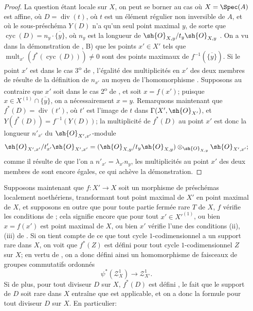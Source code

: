 \begin{proof}
La question étant locale sur $X$, on peut se borner au cas où $X=\Spec(A)$ est affine, où $D=\operatorname{div}(t)$, où $t$ est un élément régulier non inversible de $A$, et où le sous-préschéma $Y(D)$  n'a qu'un seul point maximal $y$, de sorte que $\operatorname{cyc}(D)=n_y\cdot\overline{\{y\}}$, où $n_y$ est la longueur de $\sh{O}_{X,y}/t_y\sh{O}_{X,y}$ .
On a vu dans la démonstration de , B) que les points $x'\in X'$ tels que $\operatorname{mult}_{x'}(f^*(\operatorname{cyc}(D)))\neq0$ sont des points maximaux de $f^{-1}(\overline{\{y\}})$.
Si le point $x'$ est dans le cas 3\textsuperscript{o} de , l'égalité des multiplicités en $x'$ des deux membres de  résulte de la définition de $n_{x'}$ au moyen de l'homomorphisme .
Supposons au contraire que $x'$ soit dans le cas 2\textsuperscript{o} de , et soit $x=f(x')$;
puisque $x\in X^{(1)}\cap\overline{\{y\}}$, on a nécessairement $x=y$.
Remarquons maintenant que $f^*(D)=\operatorname{div}(t')$, où $t'$ est l'image de $t$ dans $\Gamma(X',\sh{O}_{X'})$, et $Y(f^*(D))=f^{-1}(Y(D))$;
la multiplicité de $f^*(D)$ au point $x'$ est donc la longueur $n'_{x'}$ du $\sh{O}_{X',x'}$-module
\[
  \sh{O}_{X',x'}/t'_{x'}\sh{O}_{X',x'}
  =(\sh{O}_{X,y}/t_y\sh{O}_{X,y})\otimes_{\sh{O}_{X,y}}\sh{O}_{X',x'};
\]
comme il résulte de  que l'on a $n'_{x'}=\lambda_{x'}n_y$, les multiplicités au point $x'$ des deux membres de  sont encore égales, ce qui achève la démonstration.
\end{proof}

\begin{env}[21.10.5]
\label{IV.21.10.5}
Supposons maintenant que $f:X'\to X$ soit un morphisme de préschémas localement noethériens, transformant tout point maximal de $X'$ en point maximal de $X$, et supposons en outre que pour toute partie fermée rare $T$ de $X$, $f$ vérifie les conditions de ;
cela signifie encore que pour tout $x'\in X'^{(1)}$, ou bien $x=f(x')$ est point maximal de $X$, ou bien $x'$ vérifie l'une des conditions (ii), (iii) de .
Si on tient compte de ce que tout cycle $1$-codimensionnel a un support rare dans $X$, on voit que $f^*(Z)$ est défini pour tout cycle $1$-codimensionnel $Z$ sur $X$;
en vertu de , on a donc défini ainsi un homomorphisme de faisceaux de groupes commutatifs ordonnés
\[
  \psi^*(\mathscr{Z}^1_X)\to\mathscr{Z}^1_{X'}.
\]
Si de plus, pour tout diviseur $D$ sur $X$, $f^*(D)$ est défini , le fait que le support de $D$ soit rare dans $X$  entraîne que  est applicable, et on a donc la formule  pour tout diviseur $D$ sur $X$.
En particulier:
\end{env}

